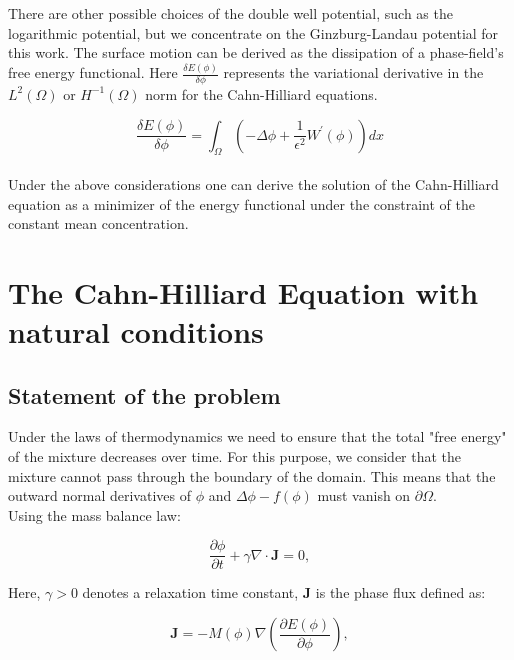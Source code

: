 \documentclass{article}
\begin{document}
There are other possible choices of the double well potential, such as the logarithmic potential, but we concentrate on the Ginzburg-Landau potential for this work. The surface motion can be derived as the dissipation of a phase-field's free energy functional. Here $\frac{\delta E(\phi)}{\delta\phi}$ represents the variational derivative in the $L^2(\Omega)$ or $H^{-1}(\Omega)$ norm for the Cahn-Hilliard equations.

\begin{equation}
\frac{\delta E(\phi)}{\delta\phi} = \int_{\Omega}\left(-\Delta\phi + \frac{1}{\epsilon^2}W^{'}(\phi)\right)dx
\end{equation}\\

Under the above considerations one can derive the solution of the Cahn-Hilliard equation as a minimizer of the energy functional under the constraint of the constant mean concentration. \\













\section{The Cahn-Hilliard Equation with natural conditions } 

\subsection{Statement of the problem}
Under the laws of thermodynamics we need to ensure that the total "free energy" of the mixture decreases over time. For this purpose, we consider that the mixture cannot pass through the boundary of the domain. This means that the outward normal derivatives of $\phi$ and $\Delta\phi - f(\phi)$ must vanish on $\partial\Omega$.\\
 
Using the mass balance law:

\begin{equation}
\frac{\partial\phi}{\partial t} + \gamma \nabla \cdot \mathbf{J} = 0,
\end{equation}

Here, $\gamma > 0$ denotes a relaxation time constant, $\mathbf{J}$ is the phase flux defined as:

\begin{equation}
\mathbf{J} = -M(\phi) \nabla \left(\frac{\partial E(\phi)}{\partial \phi}\right),
\end{equation}
\end{document}
